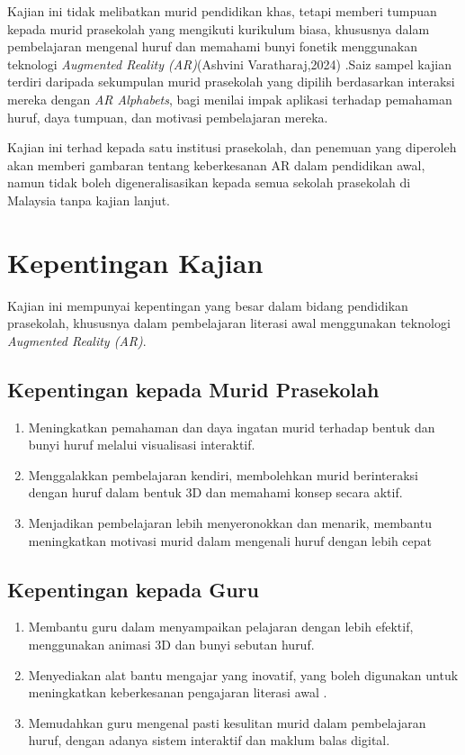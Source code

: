 \hspace{1cm}Kajian ini tidak melibatkan murid pendidikan khas, tetapi memberi tumpuan kepada murid prasekolah yang mengikuti kurikulum biasa, khususnya dalam pembelajaran mengenal huruf dan memahami bunyi fonetik menggunakan teknologi \emph{Augmented Reality (AR)}(Ashvini Varatharaj,2024) .Saiz sampel kajian terdiri daripada sekumpulan murid prasekolah yang dipilih berdasarkan interaksi mereka dengan \emph{AR Alphabets}, bagi menilai impak aplikasi terhadap pemahaman huruf, daya tumpuan, dan motivasi pembelajaran mereka.

\hspace{1cm}Kajian ini terhad kepada satu institusi prasekolah, dan penemuan yang diperoleh akan memberi gambaran tentang keberkesanan AR dalam pendidikan awal, namun tidak boleh digeneralisasikan kepada semua sekolah prasekolah di Malaysia tanpa kajian lanjut.

\section{Kepentingan Kajian}

Kajian ini mempunyai kepentingan yang besar dalam bidang pendidikan prasekolah, khususnya dalam pembelajaran literasi awal menggunakan teknologi \emph{Augmented Reality (AR)}.

\subsection{Kepentingan kepada Murid Prasekolah}
\begin{enumerate}[label=\roman*.]
    \item Meningkatkan pemahaman dan daya ingatan murid terhadap bentuk dan bunyi huruf melalui visualisasi interaktif.
    \item Menggalakkan pembelajaran kendiri, membolehkan murid berinteraksi dengan huruf dalam bentuk 3D dan memahami konsep secara aktif.
    \item Menjadikan pembelajaran lebih menyeronokkan dan menarik, membantu meningkatkan motivasi murid dalam mengenali huruf dengan lebih cepat 
\end{enumerate}

\subsection{Kepentingan kepada Guru}
\begin{enumerate}[label=\roman*.]
    \item Membantu guru dalam menyampaikan pelajaran dengan lebih efektif, menggunakan animasi 3D dan bunyi sebutan huruf.
    \item Menyediakan alat bantu mengajar yang inovatif, yang boleh digunakan untuk meningkatkan keberkesanan pengajaran literasi awal \cite{gunalan2023}.
    \item Memudahkan guru mengenal pasti kesulitan murid dalam pembelajaran huruf, dengan adanya sistem interaktif dan maklum balas digital.
\end{enumerate}

